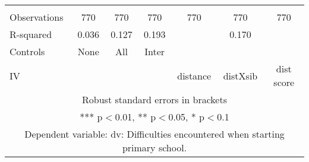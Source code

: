 \begin{tabular}{lcccccc}
 &  &  &  &  &  &  \\
Observations & 770 & 770 & 770 & 770 & 770 & 770 \\
R-squared & 0.036 & 0.127 & 0.193 &  & 0.170 &  \\
Controls & None & All & Inter &  &  &  \\
 IV &  &  &  & distance & distXsib & dist score \\ \hline
\multicolumn{7}{c}{ Robust standard errors in brackets} \\
\multicolumn{7}{c}{ *** p$<$0.01, ** p$<$0.05, * p$<$0.1} \\
\multicolumn{7}{c}{ Dependent variable: dv: Difficulties encountered when starting primary school.} \\
\end{tabular}
